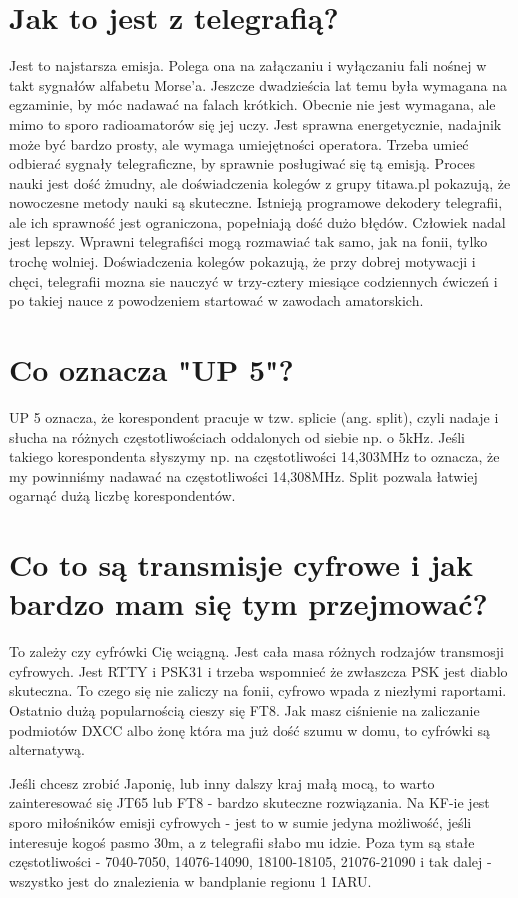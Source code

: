 \documentclass[a4paper,12pt]{article}
\begin{document}
\section{Jak to jest z telegrafią?}
Jest to najstarsza emisja. Polega ona na załączaniu i wyłączaniu fali nośnej w takt sygnałów alfabetu Morse'a. Jeszcze dwadzieścia lat temu była wymagana na egzaminie, by móc nadawać na falach krótkich. Obecnie nie jest wymagana, ale mimo to sporo radioamatorów się jej uczy. Jest sprawna energetycznie, nadajnik może być bardzo prosty, ale wymaga umiejętności operatora. Trzeba umieć odbierać sygnały telegraficzne, by sprawnie posługiwać się tą emisją. Proces nauki jest dość żmudny, ale doświadczenia kolegów z grupy titawa.pl pokazują, że nowoczesne metody nauki są skuteczne. Istnieją programowe dekodery telegrafii, ale ich sprawność jest ograniczona, popełniają dość dużo błędów. Człowiek nadal jest lepszy. Wprawni telegrafiści mogą rozmawiać tak samo, jak na fonii, tylko trochę wolniej. Doświadczenia kolegów pokazują, że przy dobrej motywacji i chęci, telegrafii mozna sie nauczyć w trzy-cztery miesiące codziennych ćwiczeń i po takiej nauce z powodzeniem startować w zawodach amatorskich.

\section{Co oznacza "UP 5"?}
UP 5 oznacza, że korespondent pracuje w tzw. splicie (ang. split), czyli nadaje i słucha na różnych częstotliwościach oddalonych od siebie np. o 5kHz. Jeśli takiego korespondenta słyszymy np. na częstotliwości 14,303MHz to oznacza, że my powinniśmy nadawać na częstotliwości 14,308MHz. Split pozwala łatwiej ogarnąć dużą liczbę korespondentów. 

\section{Co to są transmisje cyfrowe i jak bardzo mam się tym przejmować?}
To zależy czy cyfrówki Cię wciągną. 
Jest cała masa różnych rodzajów transmosji cyfrowych. Jest RTTY i PSK31 i trzeba wspomnieć że zwłaszcza PSK jest diablo skuteczna. To czego się nie zaliczy na fonii, cyfrowo wpada z niezłymi raportami. Ostatnio dużą popularnością cieszy się FT8.
Jak masz ciśnienie na zaliczanie podmiotów DXCC albo żonę która ma już dość szumu w domu, to cyfrówki są alternatywą.

Jeśli chcesz zrobić Japonię, lub inny dalszy kraj małą mocą, to warto zainteresować się JT65 lub FT8 - bardzo skuteczne rozwiązania. Na KF-ie jest sporo miłośników emisji cyfrowych - jest to w sumie jedyna możliwość, jeśli interesuje kogoś pasmo 30m, a z telegrafii słabo mu idzie. Poza tym są stałe częstotliwości - 7040-7050, 14076-14090, 18100-18105, 21076-21090 i tak dalej - wszystko jest do znalezienia w bandplanie regionu 1 IARU.
\end{document}
